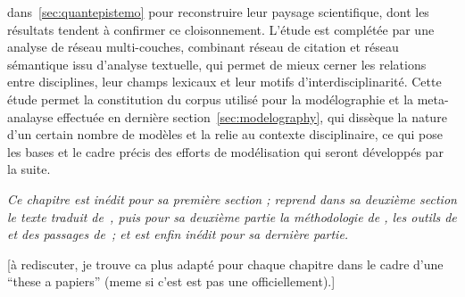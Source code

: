  dans~\ref{sec:quantepistemo} pour reconstruire leur paysage scientifique, dont les résultats tendent à confirmer ce cloisonnement. L'étude est complétée par une analyse de réseau multi-couches, combinant réseau de citation et réseau sémantique issu d'analyse textuelle, qui permet de mieux cerner les relations entre disciplines, leur champs lexicaux et leur motifs d'interdisciplinarité. Cette étude permet la constitution du corpus utilisé pour la modélographie et la meta-analayse effectuée en dernière section~\ref{sec:modelography}, qui dissèque la nature d'un certain nombre de modèles et la relie au contexte disciplinaire, ce qui pose les bases et le cadre précis des efforts de modélisation qui seront développés par la suite.






\stars


\textit{Ce chapitre est inédit pour sa première section ; reprend dans sa deuxième section le texte traduit de~\cite{raimbault2015models}, puis pour sa deuxième partie la méthodologie de \cite{raimbault2016indirect}, les outils de \cite{bergeaud2017classifying} et des passages de~\cite{}; et est enfin inédit pour sa dernière partie.}

[à rediscuter, je trouve ca plus adapté pour chaque chapitre dans le cadre d'une ``these a papiers'' (meme si c'est est pas une officiellement).]






